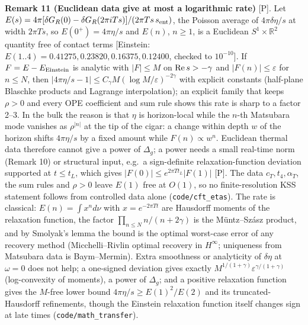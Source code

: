 \textbf{Remark 11 (Euclidean data give at most a logarithmic rate)} [P]. Let $E(s)=4\pi[\delta G_R(0)-\delta G_R(2\pi iTs)]/(2\pi Ts\,s_{\rm ent})$, the
Poisson average of $4\pi\delta\eta/s$ at width $2\pi Ts$, so $E(0^+)=4\pi\eta/s$ and $E(n)$, $n\ge1$, is a Euclidean $S^1\times\mathbb R^2$ quantity free of contact
terms [Einstein: $E(1..4)=0.41275,0.23820,0.16375,0.12400$, checked to $10^{-10}$]. If $F=E-E_{\rm Einstein}$ is analytic with $|F|\le M$ on ${\rm Re}\,s>-\gamma$
and $|F(n)|\le\varepsilon$ for $n\le N$, then $|4\pi\eta/s-1|\le C_\gamma M(\log M/\varepsilon)^{-2\gamma}$ with explicit constants (half-plane Blaschke
products and Lagrange interpolation); an explicit family that keeps $\rho>0$ and every OPE coefficient and sum rule shows this rate is sharp to a factor
2--3. In the bulk the reason is that $\eta$ is horizon-local while the $n$-th Matsubara mode vanishes as $\rho^{|n|}$ at the tip of the cigar: a change
within depth $w$ of the horizon shifts $4\pi\eta/s$ by a fixed amount while $F(n)\propto w^n$. Euclidean thermal data therefore cannot give a power of
$\Delta_g$; a power needs a small real-time norm (Remark 10) or structural input, e.g.\ a sign-definite relaxation-function deviation supported at
$t\le t_L$, which gives $|F(0)|\le e^{2\pi Tt_L}|F(1)|$ [P]. The data $c_T,t_4,\alpha_T$, the sum rules and $\rho>0$ leave $E(1)$ free at $O(1)$, so no
finite-resolution KSS statement follows from controlled data alone (\texttt{code/cft\_etas}). The rate is classical: $E(n)=\int x^n d\nu$ with $x=e^{-2\pi Tt}$ are Hausdorff moments of the relaxation function, the factor
$\prod_{n\le N}n/(n+2\gamma)$ is the M\"untz--Sz\'asz product, and by Smolyak's lemma the bound is the optimal worst-case error of any recovery method
(Micchelli--Rivlin optimal recovery in $H^\infty$; uniqueness from Matsubara data is Baym--Mermin). Extra smoothness or analyticity of $\delta\eta$ at
$\omega=0$ does not help; a one-signed deviation gives exactly $M^{1/(1+\gamma)}\varepsilon^{\gamma/(1+\gamma)}$ (log-convexity of moments), a power of
$\Delta_g$; and a positive relaxation function gives the $M$-free lower bound $4\pi\eta/s\ge E(1)^2/E(2)$ and its truncated-Hausdorff refinements, though
the Einstein relaxation function itself changes sign at late times (\texttt{code/math\_transfer}).

